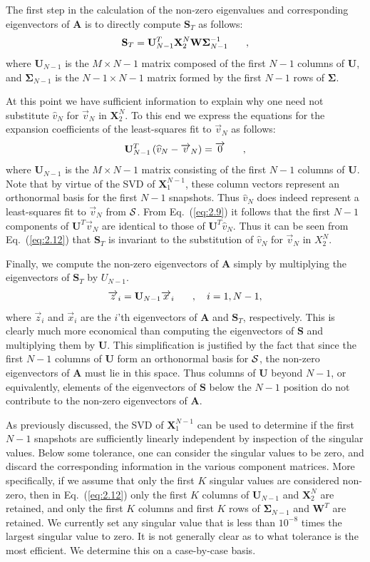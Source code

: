 \documentclass{style/nseJournal}
\newcommand{\fn}[1]{\left( #1 \right)}
\renewcommand{\vec}[1]{\overrightarrow{#1}}
\newcommand{\be}{\begin{equation}}
\newcommand{\ee}{\end{equation}}
\newcommand{\pec}{\hspace{0.25in},}
\newcommand{\LEQ}[1]{\label{eq:#1}}
\newcommand{\EQ}[1]{Eq.~(\ref{eq:#1})}
\newcommand{\cS}{{\cal S}}
\newcommand{\mA}{\mathbf{A}}
\newcommand{\mX}{\mathbf{X}}
\newcommand{\mU}{\mathbf{U}}
\newcommand{\mW}{\mathbf{W}}
\newcommand{\mSigma}{\mathbf{\Sigma}}
\newcommand{\mS}{\mathbf{S}}
\begin{document}
The first step in the calculation of the non-zero eigenvalues and corresponding 
eigenvectors of $\mA$ is to directly compute $\mS_T$ as follows:
\be
	\mS_T = \mU_{N-1}^{T} \mX_{2}^{N}\mW\mSigma^{-1}_{N-1} \pec
	\LEQ{2.12}
\ee
where $\mU_{N-1}$ is the $M \times N-1$ matrix composed of the first $N-1$ columns of $\mU$, and $\mSigma_{N-1}$ is the $N-1 \times N-1$ matrix formed by the first $N-1$ rows of $\mSigma$.  

At this point we have sufficient information to explain why one need not substitute $\widehat{v}_N$ for $\vec{v}_N$ in $\mX_2^{N}$.  
To this end we express the equations for the expansion coefficients of the least-squares fit to $\vec{v}_N$ as follows:
\be
	\mU^T_{N-1}\fn{\widehat{v}_N - \vec{v}_N} = \vec{0} \pec
	\LEQ{2.9}
\ee
where $\mU_{N-1}$ is the $M \times N-1$ matrix consisting of the first $N-1$ columns of $\mU$.  
Note that by virtue of the SVD of $\mX_{1}^{N-1}$, these column vectors represent an orthonormal basis for the first $N-1$ snapshots.  
Thus $\widehat{v}_N$ does indeed represent a least-squares fit to $\vec{v}_N$ from $\cS$.  
From \EQ{2.9} it follows that the first $N-1$ components of $\mU^T \vec{v}_N$ are identical to those of $\mU^T \widehat{v}_N$.  
Thus it can be seen from \EQ{2.12} that $\mS_T$ is invariant to the substitution of $\widehat{v}_N$ for $\vec{v}_N$ in $X_{2}^{N}$.  

Finally, we compute the non-zero eigenvectors of $\mA$ simply by multiplying the eigenvectors of $\mS_T$ by $U_{N-1}$.  
\be
	\vec{z}_i = \mU_{N-1} \vec{x}_i \pec \quad i=1,N-1,
	\LEQ{2.13}
\ee
where $\vec{z}_i$ and $\vec{x}_i$ are the $i$'th eigenvectors of $\mA$ and $\mS_T$, respectively.  
This is clearly much more economical than computing the eigenvectors of $\mS$ and multiplying them by $\mU$.  
This simplification is justified by the fact that since the first $N-1$ columns of $\mU$ form an orthonormal basis for $\cS$, the non-zero eigenvectors of $\mA$ must lie in this space.  
Thus columns of $\mU$ beyond $N-1$, or equivalently, elements of the eigenvectors of $\mS$ below the $N-1$ position do not contribute to the non-zero eigenvectors of $\mA$.  

As previously discussed, the SVD of $\mX_{1}^{N-1}$ can be used to determine if the first $N-1$ snapshots are sufficiently linearly independent by inspection  of the singular values.  
Below some tolerance, one can consider the singular values to be zero, and discard the corresponding information in the various component matrices.  
More specifically, if we assume that only the first $K$ singular values are considered non-zero, then in \EQ{2.12} only the first $K$ columns of $\mU_{N-1}$ and $\mX_{2}^{N}$ are retained, and only the first $K$ columns and first $K$ rows of $\mSigma_{N-1}$ and $\mW^T$ are retained.  
We currently set any singular value that is less than $10^{-8}$ times the largest singular value to zero. 
It is not generally clear as to what tolerance is the most efficient.  
We determine this on a case-by-case basis.  
\end{document}
